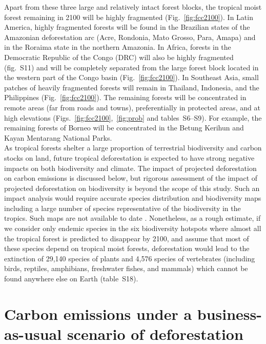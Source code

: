 \documentclass[
  12pt,
]{article}
\begin{document}
Apart from these three large and relatively intact forest blocks, the tropical moist forest remaining in 2100 will be highly fragmented (Fig.~\ref{fig:fcc2100}). In Latin America, highly fragmented forests will be found in the Brazilian states of the Amazonian deforestation arc (Acre, Rondonia, Mato Grosso, Para, Amapa) and in the Roraima state in the northern Amazonia. In Africa, forests in the Democratic Republic of the Congo (DRC) will also be highly fragmented (fig.~S11) and will be completely separated from the large forest block located in the western part of the Congo basin (Fig.~\ref{fig:fcc2100}). In Southeast Asia, small patches of heavily fragmented forests will remain in Thailand, Indonesia, and the Philippines (Fig.~\ref{fig:fcc2100}). The remaining forests will be concentrated in remote areas (far from roads and towns), preferentially in protected areas, and at high elevations (Figs.~\ref{fig:fcc2100},~\ref{fig:prob} and tables~S6--S9). For example, the remaining forests of Borneo will be concentrated in the Betung Kerihun and Kayan Mentarang National Parks.\\

As tropical forests shelter a large proportion of terrestrial biodiversity and carbon stocks on land, future tropical deforestation is expected to have strong negative impacts on both biodiversity and climate. The impact of projected deforestation on carbon emissions is discussed below, but rigorous assessment of the impact of projected deforestation on biodiversity is beyond the scope of this study. Such an impact analysis would require accurate species distribution and biodiversity maps including a large number of species representative of the biodiversity in the tropics. Such maps are not available to date \citep{Pimm2014}. Nonetheless, as a rough estimate, if we consider only endemic species \citep{Mittermeier2011} in the six biodiversity hotspots where almost all the tropical forest is predicted to disappear by 2100, and assume that most of these species depend on tropical moist forests, deforestation would lead to the extinction of 29,140 species of plants and 4,576 species of vertebrates (including birds, reptiles, amphibians, freshwater fishes, and mammals) which cannot be found anywhere else on Earth (table~S18).

\newpage

\hypertarget{carbon-emissions-under-a-business-as-usual-scenario-of-deforestation}{%
\section{Carbon emissions under a business-as-usual scenario of deforestation}\label{carbon-emissions-under-a-business-as-usual-scenario-of-deforestation}}
\end{document}
